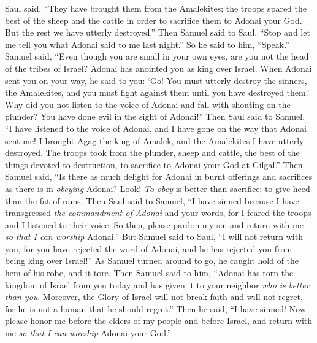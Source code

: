 \begin{biblechapter}
\verse Saul said, “They have brought them from the Amalekites; the troops spared the best of the sheep and the cattle in order to sacrifice them to Adonai your God. But the rest we have utterly destroyed.”
\verse Then Samuel said to Saul, “Stop and let me tell you what Adonai said to me last night.” So he said to him, “Speak.”
\verse Samuel said, “Even though you are small in your own eyes, are you not the head of the tribes of Israel? Adonai has anointed you as king over Israel.
\verse When Adonai sent you on your way, he said to you: ‘Go! You must utterly destroy the sinners, the Amalekites, and you must fight against them until you have destroyed them.’
\verse Why did you not listen to the voice of Adonai and fall with shouting on the plunder? You have done evil in the sight of Adonai!”
\verse Then Saul said to Samuel, “I have listened to the voice of Adonai, and I have gone on the way that Adonai sent me! I brought Agag the king of Amalek, and the Amalekites I have utterly destroyed.
\verse The troops took from the plunder, sheep and cattle, the best of the things devoted to destruction, to sacrifice to Adonai your God at Gilgal.”
\verse Then Samuel said,
\verse “Is there as much delight for Adonai in burnt offerings and sacrifices 
as there is in \textit{obeying} Adonai? 
Look! \textit{To obey} is better than sacrifice; 
to give heed than the fat of rams.
\verse Then Saul said to Samuel, “I have sinned because I have transgressed \textit{the commandment of Adonai} and your words, for I feared the troops and I listened to their voice.
\verse So then, please pardon my sin and return with me \textit{so that I can worship} Adonai.”
\verse But Samuel said to Saul, “I will not return with you, for you have rejected the word of Adonai, and he has rejected you from being king over Israel!”
\verse As Samuel turned around to go, he caught hold of the hem of his robe, and it tore.
\verse Then Samuel said to him, “Adonai has torn the kingdom of Israel from you today and has given it to your neighbor \textit{who is better than you}.
\verse Moreover, the Glory of Israel will not break faith and will not regret, for he is not a human that he should regret.”
\verse Then he said, “I have sinned! Now please honor me before the elders of my people and before Israel, and return with me \textit{so that I can worship} Adonai your God.”

\end{biblechapter}
